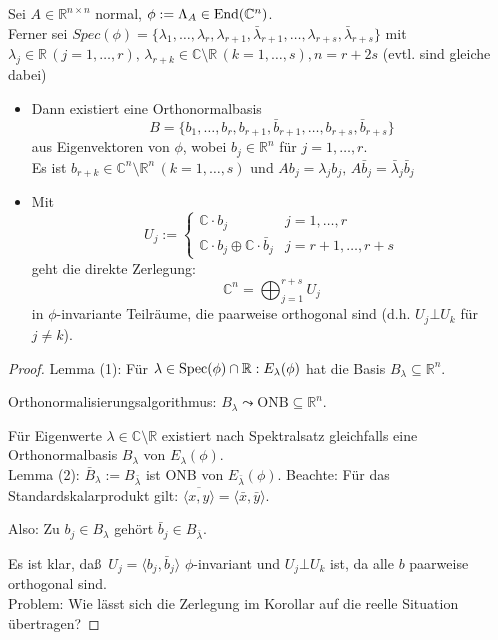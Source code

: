 \documentclass[parskip,a4paper,twoside,DIV15,BCOR12mm]{scrbook}
\begin{document}
\begin{corollary}
Sei \(A\in\mathbb{R}^{n\times n}\) normal, 
\(\phi:=\Lambda_{A}\in\operatorname{End}(\mathbb{C}^{n})\).\\
Ferner sei \(Spec(\phi)=\{\lambda_{1},\ldots,\lambda_{r},\lambda_{r+1},\bar{\lambda}_{r+1},\ldots,\lambda_{r+s},\bar{\lambda}_{r+s}\}\)
mit \(\lambda_{j}\in\mathbb{R}\,(j=1,\ldots,r),\,\lambda_{r+k}\in
\mathbb{C}\setminus\mathbb{R}\,(k=1,\ldots,s), n=r+2s\) 
(evtl. sind gleiche dabei)
\begin{itemize}
\item Dann existiert eine Orthonormalbasis
\[
B=\{b_{1},\ldots,b_{r},b_{r+1},\bar{b}_{r+1},\ldots,b_{r+s},\bar{b}_{r+s}\}
\]
aus Eigenvektoren von \(\phi\), wobei \(b_{j}\in\mathbb{R}^{n}\) für 
\(j=1,\ldots,r\).\\
Es ist \(b_{r+k}\in\mathbb{C}^{n}\setminus\mathbb{R}^{n}\,(k=1,\ldots,s)\) und
\(Ab_{j}=\lambda_{j}b_{j},\,A\bar{b}_{j}=\bar{\lambda}_{j}\bar{b}_{j}\)
\item Mit 
\[
U_{j}:=\begin{cases}
\mathbb{C}\cdot b_{j}&j=1,\ldots,r\\
\mathbb{C}\cdot b_{j}\oplus\mathbb{C}\cdot\bar{b}_{j}&j=r+1,\ldots,r+s
\end{cases}
\]
geht die direkte Zerlegung:
\[
\mathbb{C}^{n}=\bigoplus_{j=1}^{r+s}{U_{j}}
\]
in \(\phi\)-invariante Teilräume, die paarweise orthogonal sind (d.h.
\(U_{j}\bot U_{k}\) für \(j\neq k\)).
\end{itemize}
\end{corollary}
\begin{proof}
Lemma (1): Für 
\(\lambda\in\operatorname{Spec}(\phi)\cap\mathbb{R}: E_{\lambda}(\phi)\) hat die Basis
\(B_{\lambda}\subseteq\mathbb{R}^{n}\).

Orthonormalisierungsalgorithmus: \(B_{\lambda}\leadsto\text{ONB}\subseteq\mathbb{R}^{n}\).

Für Eigenwerte \(\lambda\in\mathbb{C}\setminus\mathbb{R}\) existiert nach 
Spektralsatz gleichfalls eine Orthonormalbasis \(B_{\lambda}\) von \(E_{\lambda}(\phi)\).\\

Lemma (2): \(\bar{B}_{\lambda}:=B_{\bar{\lambda}}\) ist ONB von \(E_{\bar{\lambda}}(\phi)\). Beachte: Für das Standardskalarprodukt gilt: \(\overline{\langle x,y\rangle}=\langle\bar{x},\bar{y}\rangle\).

Also: Zu \(b_{j}\in B_{\lambda}\) gehört \(\bar{b}_{j}\in B_{\bar{\lambda}}\).

Es ist klar, da\ss \ \(U_{j}=\langle b_{j},\bar{b}_{j}\rangle\) 
\(\phi\)-invariant und \(U_{j}\bot U_{k}\) ist, da alle \(b\) paarweise 
orthogonal sind.\\
Problem: Wie lässt sich die Zerlegung im Korollar auf die reelle Situation
übertragen?
\end{proof}
\end{document}
